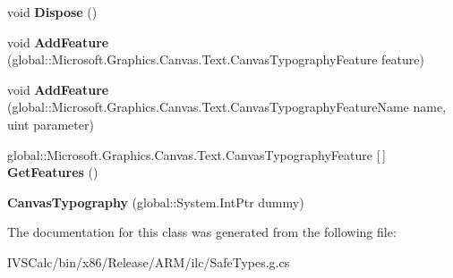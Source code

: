\begin{DoxyCompactItemize}
void {\bfseries Dispose} ()
\item 
\mbox{\label{class_microsoft_1_1_graphics_1_1_canvas_1_1_text_1_1_canvas_typography_adb24235074d7ba03317c093ee442f78d}} 
void {\bfseries Add\+Feature} (global\+::\+Microsoft.\+Graphics.\+Canvas.\+Text.\+Canvas\+Typography\+Feature feature)
\item 
\mbox{\label{class_microsoft_1_1_graphics_1_1_canvas_1_1_text_1_1_canvas_typography_ad4ae4dcdbdf7c24abf69746742cc3d0c}} 
void {\bfseries Add\+Feature} (global\+::\+Microsoft.\+Graphics.\+Canvas.\+Text.\+Canvas\+Typography\+Feature\+Name name, uint parameter)
\item 
\mbox{\label{class_microsoft_1_1_graphics_1_1_canvas_1_1_text_1_1_canvas_typography_a91ad523c9e09574205511271e56e706b}} 
global\+::\+Microsoft.\+Graphics.\+Canvas.\+Text.\+Canvas\+Typography\+Feature \mbox{[}$\,$\mbox{]} {\bfseries Get\+Features} ()
\item 
\mbox{\label{class_microsoft_1_1_graphics_1_1_canvas_1_1_text_1_1_canvas_typography_acfaa49a5331916c8f6730fa502fc9485}} 
{\bfseries Canvas\+Typography} (global\+::\+System.\+Int\+Ptr dummy)
\end{DoxyCompactItemize}


The documentation for this class was generated from the following file\+:\begin{DoxyCompactItemize}
\item 
I\+V\+S\+Calc/bin/x86/\+Release/\+A\+R\+M/ilc/Safe\+Types.\+g.\+cs\end{DoxyCompactItemize}
